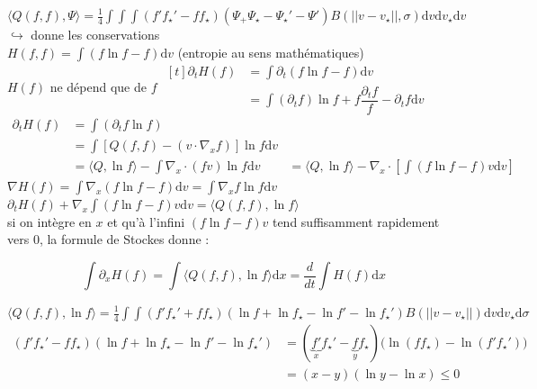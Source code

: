\documentclass[12pt,a4paper]{article}
\begin{document}
$\langle Q(f,f),\Psi\rangle = \frac14 \displaystyle\int\int\int \left(f'f_\star'-ff_\star\right)\left(\Psi_+\Psi_\star-\Psi_\star'-\Psi'\right)B(|\!|v-v_\star|\!|,\sigma)\mathrm dv \mathrm dv_\star \mathrm dv$\\
$\hookrightarrow$ donne les conservations\\
$H(f,f) = \displaystyle\int\left(f\ln f - f\right) \mathrm dv$ (entropie au sens mathématiques)\\
$H(f)$ ne dépend que de $f$ \hspace{.5cm} $\begin{aligned}[t]
	\partial_t H(f) &=\displaystyle\int \partial_t\left(f\ln f - f\right)\mathrm dv \\
	&= \int \left(\partial_t f\right)\ln f + f \dfrac{\partial_t f}f-\partial_t f \mathrm dv
\end{aligned}$\\

$\begin{aligned}
	\partial_t H(f) &= \displaystyle\int \left(\partial_t f \ln f\right)\\
	&= \int \left[Q(f,f)-(v\cdot\nabla_x f)\right]\ln f \mathrm dv \\
	&= \langle Q,\ln f\rangle - \displaystyle\int \nabla_x\cdot\left(fv\right)\ln f\mathrm dv &=\langle Q,\ln f\rangle - \nabla_x \cdot \left[\int \left(f\ln f -f\right)v \mathrm dv\right]
\end{aligned}$\\

$\nabla H(f) = \displaystyle\int \nabla_x\left(f\ln f - f\right)\mathrm dv = \int \nabla_x f \ln f \mathrm dv$\\

$\partial_t H(f) + \nabla_x\displaystyle\int \left(f\ln f - f\right)v\mathrm dv = \langle Q(f,f),\ln f\rangle$\\
si on intègre en $x$ et qu'à l'infini $(f\ln f - f)v$ tend suffisamment rapidement vers 0, la formule de Stockes donne :

\[
\displaystyle\int \partial_x H(f) = \int \langle Q(f,f),\ln f\rangle \mathrm dx = \frac d{dt} \int H(f) \mathrm dx
\]

$\langle Q(f,f),\ln f\rangle = \frac14 \displaystyle\int\int\left(f'f_\star'+ff_\star\right)\left(\ln f+\ln f_\star - \ln f' - \ln f_\star'\right)B(|\!|v-v_\star|\!|)\mathrm dv \mathrm dv_\star \mathrm d\sigma$\\
$\begin{aligned}
	\left(f'f_\star'-ff_\star\right)\left(\ln f +\ln f_\star-\ln f' - \ln f_\star'\right) &= \left(\underbrace{f'}_x f_\star'-\underbrace f_y f_\star\right)\Big(\ln(ff_\star)-\ln(f'f_\star')\Big)\\
	&= (x-y)\left(\ln y - \ln x\right) \leq 0
\end{aligned}$\\
\end{document}
